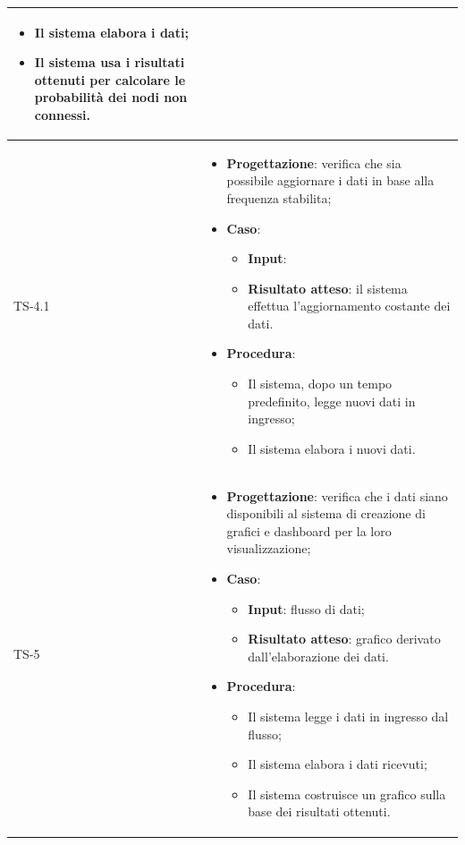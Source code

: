 \begin{longtable}{|C{2.5cm}|C{13cm}|}
\begin{itemize}
\begin{itemize}
	\item Il sistema elabora i dati;
	\item Il sistema usa i risultati ottenuti per calcolare le probabilità dei nodi non connessi.
	\end{itemize}
\end{itemize}
	\\
	\hline
	{TS-4.1} & 
\begin{itemize}
	\item \textbf{Progettazione}: verifica che sia possibile aggiornare i dati
	in base alla frequenza stabilita;
	\item \textbf{Caso}: 
	\begin{itemize}
		\item \textbf{Input}:
		\item \textbf{Risultato atteso}: il sistema effettua l'aggiornamento costante dei dati.
	\end{itemize}
	\item \textbf{Procedura}:
	\begin{itemize}
		\item Il sistema, dopo un tempo predefinito, legge nuovi dati in ingresso;
		\item Il sistema elabora i nuovi dati.
	\end{itemize} 
\end{itemize} \\
	\hline
	{TS-5} & 
\begin{itemize}
	\item \textbf{Progettazione}: verifica che i dati siano disponibili al sistema di
	creazione di grafici e dashboard per la loro visualizzazione;
	\item \textbf{Caso}: 
	\begin{itemize}
		\item \textbf{Input}: flusso di dati;
		\item \textbf{Risultato atteso}: grafico derivato dall'elaborazione dei dati.
	\end{itemize}
	\item \textbf{Procedura}:
	\begin{itemize}
		\item Il sistema legge i dati in ingresso dal flusso;
		\item Il sistema elabora i dati ricevuti;
		\item Il sistema costruisce un grafico sulla base dei risultati ottenuti.
	\end{itemize} 
\end{itemize}

\end{longtable}
